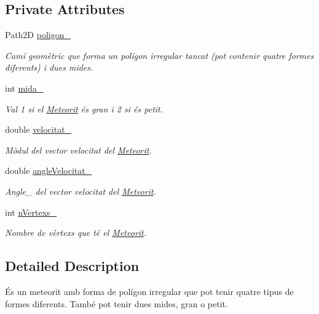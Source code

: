 \subsection*{Private Attributes}
\begin{DoxyCompactItemize}
\item 
Path2\+D \hyperlink{class_meteorit_a1dd8a11e4ec8c806ee66a50773daeaf7}{poligon\+\_\+}
\begin{DoxyCompactList}\small\item\em Camí geomètric que forma un polígon irregular tancat (pot contenir quatre formes diferents) i dues mides. \end{DoxyCompactList}\item 
int \hyperlink{class_meteorit_a8edd607e17be6537c15ab04bfd29dc52}{mida\+\_\+}
\begin{DoxyCompactList}\small\item\em Val 1 si el \hyperlink{class_meteorit}{Meteorit} és gran i 2 si és petit. \end{DoxyCompactList}\item 
double \hyperlink{class_meteorit_a6d567bfb1f4d118c6c36c7bff76ec28a}{velocitat\+\_\+}
\begin{DoxyCompactList}\small\item\em Mòdul del vector velocitat del \hyperlink{class_meteorit}{Meteorit}. \end{DoxyCompactList}\item 
double \hyperlink{class_meteorit_ae642e495aeb2d78122cb2ae550dde61b}{angle\+Velocitat\+\_\+}
\begin{DoxyCompactList}\small\item\em Angle\+\_\+ del vector velocitat del \hyperlink{class_meteorit}{Meteorit}. \end{DoxyCompactList}\item 
int \hyperlink{class_meteorit_a3b015faa09e271a0e54de95d1c9716c6}{n\+Vertexs\+\_\+}
\begin{DoxyCompactList}\small\item\em Nombre de vèrtexs que té el \hyperlink{class_meteorit}{Meteorit}. \end{DoxyCompactList}\end{DoxyCompactItemize}


\subsection{Detailed Description}
És un meteorit amb forma de polígon irregular que pot tenir quatre tipus de formes diferents. També pot tenir dues mides, gran o petit. 

